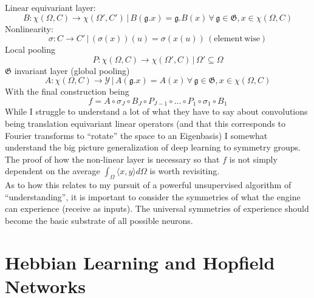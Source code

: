 \documentclass{article}
\begin{document}
Linear equivariant layer:
\begin{equation}
    B: \chi(\Omega, C) \to \chi(\Omega', C') \, | \, B(\mathfrak{g}.x) =\mathfrak{g}.B(x) \, \forall \, \mathfrak{g} \in \mathfrak{G}, x\in \chi(\Omega,C)
\end{equation}
Nonlinearity:
\begin{equation}
    \sigma: C \to C' \, | \, (\sigma(x))(u) = \sigma(x(u)) \, \mathrm{(element \, wise)}
\end{equation}
Local pooling 
\begin{equation}
    P: \chi (\Omega,C) \to \chi(\Omega', C) \, | \, \Omega' \subseteq \Omega
\end{equation}
$\mathfrak{G}$ invariant layer (global pooling)
\begin{equation}
    A: \chi(\Omega, C) \to \mathcal{Y} \, | \, A(\mathfrak{g}.x) = A(x) \, \forall \, \mathfrak{g} \in \mathfrak{G}, x\in \chi(\Omega,C)
\end{equation}
With the final construction being
\begin{equation}
    f = A \circ \sigma_J \circ B_J \circ P_{J-1} \circ ... \circ P_1 \circ \sigma_1 \circ B_1
\end{equation}
While I struggle to understand a lot of what they have to say about convolutions being translation equivariant linear operators (and that this corresponds to Fourier transforms to ``rotate'' the space to an Eigenbasis) I somewhat understand the big picture generalization of deep learning to symmetry groups. The proof of how the non-linear layer is necessary so that $f$ is not simply dependent on the average $\int_\Omega \langle x,y \rangle d\Omega$ is worth revisiting. \\

As to how this relates to my pursuit of a powerful unsupervised algorithm of ``understanding'', it is important to consider the symmetries of what the engine can experience (receive as inputs). The universal symmetries of experience should become the basic substrate of all possible neurons.



\section{Hebbian Learning and Hopfield Networks}
\end{document}
